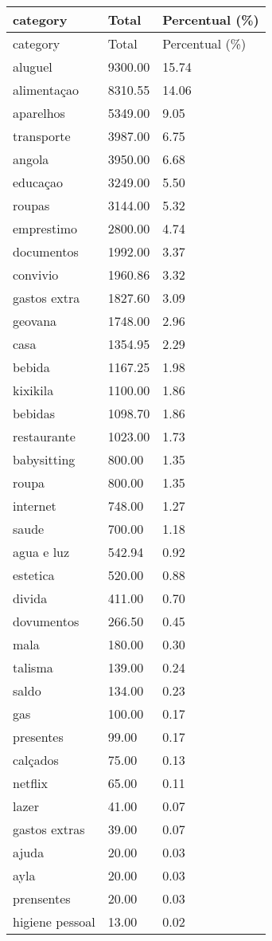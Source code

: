 \documentclass[
  8pt,
  a4paper,
  DIV=11,
  numbers=noendperiod]{scrartcl}
\begin{document}
\begin{figure}
\begin{minipage}{0.50\linewidth}
\begin{longtable}[]{@{}lll@{}}
\caption{}\label{T_eabdb}\tabularnewline
\toprule\noalign{}
category & Total & Percentual (\%) \\
\midrule\noalign{}
\endfirsthead
\toprule\noalign{}
category & Total & Percentual (\%) \\
\midrule\noalign{}
\endhead
\bottomrule\noalign{}
\endlastfoot
aluguel & 9300.00 & 15.74 \\
alimentaçao & 8310.55 & 14.06 \\
aparelhos & 5349.00 & 9.05 \\
transporte & 3987.00 & 6.75 \\
angola & 3950.00 & 6.68 \\
educaçao & 3249.00 & 5.50 \\
roupas & 3144.00 & 5.32 \\
emprestimo & 2800.00 & 4.74 \\
documentos & 1992.00 & 3.37 \\
convivio & 1960.86 & 3.32 \\
gastos extra & 1827.60 & 3.09 \\
geovana & 1748.00 & 2.96 \\
casa & 1354.95 & 2.29 \\
bebida & 1167.25 & 1.98 \\
kixikila & 1100.00 & 1.86 \\
bebidas & 1098.70 & 1.86 \\
restaurante & 1023.00 & 1.73 \\
babysitting & 800.00 & 1.35 \\
roupa & 800.00 & 1.35 \\
internet & 748.00 & 1.27 \\
saude & 700.00 & 1.18 \\
agua e luz & 542.94 & 0.92 \\
estetica & 520.00 & 0.88 \\
divida & 411.00 & 0.70 \\
dovumentos & 266.50 & 0.45 \\
mala & 180.00 & 0.30 \\
talisma & 139.00 & 0.24 \\
saldo & 134.00 & 0.23 \\
gas & 100.00 & 0.17 \\
presentes & 99.00 & 0.17 \\
calçados & 75.00 & 0.13 \\
netflix & 65.00 & 0.11 \\
lazer & 41.00 & 0.07 \\
gastos extras & 39.00 & 0.07 \\
ajuda & 20.00 & 0.03 \\
ayla & 20.00 & 0.03 \\
prensentes & 20.00 & 0.03 \\
higiene pessoal & 13.00 & 0.02 \\
\end{longtable}


\end{minipage}
\end{figure}
\end{document}
